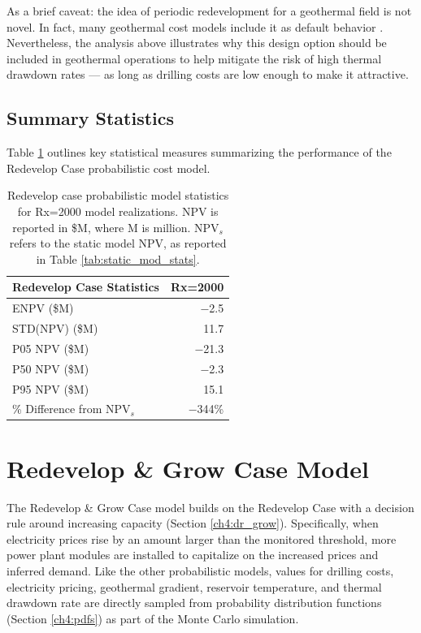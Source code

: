 As a brief caveat: the idea of periodic redevelopment for a geothermal field is not novel. In fact, many geothermal cost models include it as default behavior \citep[e.g.,\ ][]{entingh_volume_2006, blair_system_2018}. Nevertheless, the analysis above illustrates why this design option should be included in geothermal operations to help mitigate the risk of high thermal drawdown rates --- as long as drilling costs are low enough to make it attractive. 

\subsection{Summary Statistics}\label{ch6:redevelop_stats}

Table \ref{tab:redevelop_stats} outlines key statistical measures summarizing the performance of the Redevelop Case probabilistic cost model.

\begin{table}[H]
\centering
\begin{tabular}{|l|r|}
\hline
\textbf{Redevelop Case Statistics} & Rx=2000 \\ \hline
ENPV (\$M) & $\boldsymbol{-}$2.5 \\ \hline
STD(NPV) (\$M) & 11.7 \\ \hline
P05 NPV (\$M) & $\boldsymbol{-}$21.3 \\ \hline
P50 NPV (\$M) & $\boldsymbol{-}$2.3 \\ \hline
P95 NPV (\$M) & 15.1 \\ \hline
\% Difference from NPV$_{s}$ & $\boldsymbol{-}$344\% \\ \hline
\end{tabular}
\caption[Probabilistic Redevelop Case statistics]{Redevelop case probabilistic model statistics for Rx=2000 model realizations. NPV is reported in \$M, where M is million. NPV$_s$ refers to the static model NPV, as reported in Table \ref{tab:static_mod_stats}.}
\label{tab:redevelop_stats}
\end{table}

\section{Redevelop \& Grow Case Model}\label{ch6:grow_case}

The Redevelop \& Grow Case model builds on the Redevelop Case with a decision rule around increasing capacity (Section \ref{ch4:dr_grow}). Specifically, when electricity prices rise by an amount larger than the monitored threshold, more power plant modules are installed to capitalize on the increased prices and inferred demand. Like the other probabilistic models, values for drilling costs, electricity pricing, geothermal gradient, reservoir temperature, and thermal drawdown rate are directly sampled from probability distribution functions (Section \ref{ch4:pdfs}) as part of the Monte Carlo simulation.

